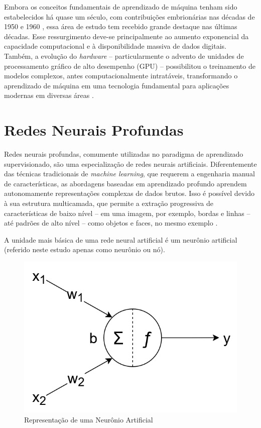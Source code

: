 Embora os conceitos fundamentais de aprendizado de máquina tenham sido estabelecidos há quase um século, com contribuições embrionárias nas décadas de 1950 e 1960 \cite{mlDietterich}, essa área de estudo tem recebido grande destaque nas últimas décadas. Esse ressurgimento deve-se principalmente ao aumento exponencial da capacidade computacional e à disponibilidade massiva de dados digitais. Também, a evolução do \textit{hardware} -- particularmente o advento de unidades de processamento gráfico de alto desempenho (GPU) -- possibilitou o treinamento de modelos complexos, antes computacionalmente intratáveis, transformando o aprendizado de máquina em uma tecnologia fundamental para aplicações modernas em diversas áreas \cite{mlSarker}.

\section{Redes Neurais Profundas}

Redes neurais profundas, comumente utilizadas no paradigma de aprendizado supervisionado, são uma especialização de redes neurais artificiais. Diferentemente das técnicas tradicionais de \textit{machine learning}, que requerem a engenharia manual de características, as abordagens baseadas em aprendizado profundo aprendem autonomamente representações complexas de dados brutos. Isso é possível devido à sua estrutura multicamada, que permite a extração progressiva de características de baixo nível -- em uma imagem, por exemplo, bordas e linhas -- até padrões de alto nível -- como objetos e faces, no mesmo exemplo \cite{efficientdeep}.

A unidade mais básica de uma rede neural artificial é um neurônio artificial (referido neste estudo apenas como neurônio ou nó).

\begin{figure}[H]
	\caption{\label{fig:neuron}Representação de uma  Neurônio Artificial}
    \begin{center}
    \includegraphics[width=0.7\linewidth]{images/neuron.png}
	\end{center}
\end{figure}

